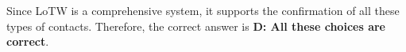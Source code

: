 Since LoTW is a comprehensive system, it supports the confirmation of all these types of contacts. Therefore, the correct answer is \textbf{D: All these choices are correct}.


